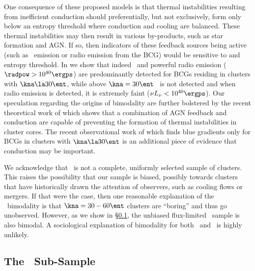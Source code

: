 \documentclass{emulateapj}
\begin{document}
One consequence of these proposed models is that thermal instabilities
resulting from inefficient conduction should preferentially, but not
exclusively, form only below an entropy threshold where conduction and
cooling are balanced. These thermal instabilities may then result in
various by-products, such as star formation and AGN. If so, then
indicators of these feedback sources being active (such as \halpha\
emission or radio emission from the BCG) would be sensitive to and
entropy threshold. In \cite{haradent} we show that indeed \halpha\ and
powerful radio emission ($\radpow > 10^{40} \ergps$) are
predominantly detected for BCGs residing in clusters with $\kna \la 30
\ent$, while above $\kna = 30 \ent$ \halpha\ is not detected and when
radio emission is detected, it is extremely faint ($\nu L_{\nu} <
10^{40} \ergps$). Our speculation regarding the origins of bimodality
are further bolstered by the recent theoretical work of
\cite{2008arXiv0804.3823G} which shows that a combination of AGN feedback
and conduction are capable of preventing the formation of thermal
instabilities in cluster cores. The recent observational work of
\cite{2008arXiv0802.1864R} which finds blue gradients only for BCGs in
clusters with $\kna \la 30 \ent$ is an additional piece of evidence
that conduction may be important.

We acknowledge that \accept\ is not a complete, uniformly selected
sample of clusters. This raises the possibility that our sample is
biased, possibly towards clusters that have historically drawn the
attention of observers, such as cooling flows or mergers. If that were
the case, then one reasonable explanation of the \kna\ bimodality is
that $\kna = 30-60 \ent$ clusters are ``boring'' and thus go
unobserved. However, as we show in \S\ref{sec:hifl}, the unbiased
flux-limited \hifl\ sample is also bimodal. A sociological explanation
of bimodality for both \accept\ and \hifl\ is highly unlikely.

\subsection{The \hifl\ Sub-Sample}
\label{sec:hifl}
\end{document}
